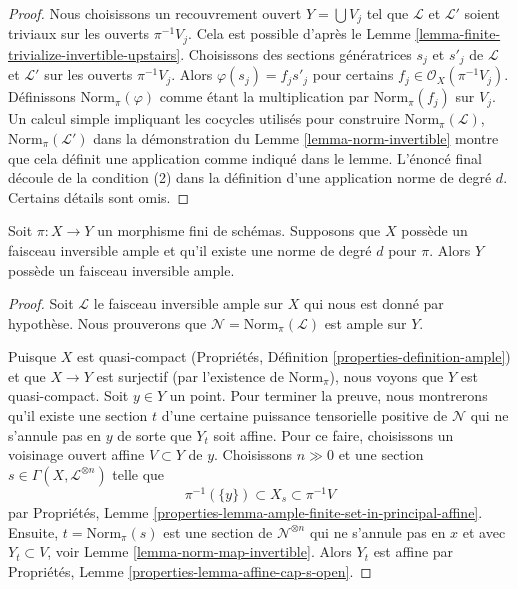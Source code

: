\begin{proof}
Nous choisissons un recouvrement ouvert  $Y = \bigcup V_j$  tel que  $\mathcal{L}$  et
 $\mathcal{L}'$  soient triviaux sur les ouverts  $\pi^{-1}V_j$. Cela est possible
d'après le Lemme  \ref{lemma-finite-trivialize-invertible-upstairs}. Choisissons des sections génératrices  $s_j$ 
et  $s'_j$  de  $\mathcal{L}$  et  $\mathcal{L}'$  sur les ouverts  $\pi^{-1}V_j$.
Alors  $\varphi(s_j) = f_js'_j$  pour certains  $f_j \in \mathcal{O}_X(\pi^{-1}V_j)$. Définissons  $\text{Norm}_\pi(\varphi)$  comme étant
la multiplication par  $\text{Norm}_\pi(f_j)$  sur  $V_j$. Un calcul simple impliquant
les cocycles utilisés pour construire  $\text{Norm}_\pi(\mathcal{L})$,  $\text{Norm}_\pi(\mathcal{L}')$  dans la
démonstration du Lemme  \ref{lemma-norm-invertible}  montre que cela définit une application comme
indiqué dans le lemme. L'énoncé final découle de la condition (2) dans la
définition d'une application norme de degré  $d$. Certains détails sont
omis.
\end{proof}

\begin{lemma}
\label{lemma-norm-ample}
Soit  $\pi : X \to Y$  un morphisme fini de schémas. Supposons que  $X$  possède
un faisceau inversible ample et qu'il existe une norme de degré  $d$  pour
 $\pi$. Alors  $Y$  possède un faisceau inversible ample.
\end{lemma}

\begin{proof}
Soit  $\mathcal{L}$  le faisceau inversible ample sur  $X$  qui nous est donné
par hypothèse. Nous prouverons que  $\mathcal{N} = \text{Norm}_\pi(\mathcal{L})$  est ample sur  $Y$.

\medskip\noindent
Puisque  $X$  est quasi-compact (Propriétés, Définition  \ref{properties-definition-ample}) et
que  $X \to Y$  est surjectif (par l'existence de  $\text{Norm}_\pi$), nous voyons que
 $Y$  est quasi-compact. Soit  $y \in Y$  un point. Pour terminer la
preuve, nous montrerons qu'il existe une section  $t$  d'une certaine
puissance tensorielle positive de  $\mathcal{N}$  qui ne s'annule pas en  $y$ 
de sorte que  $Y_t$  soit affine. Pour ce faire, choisissons un voisinage
ouvert affine  $V \subset Y$  de  $y$. Choisissons  $n \gg 0$  et une section
 $s \in \Gamma(X, \mathcal{L}^{\otimes n})$  telle que
$$
\pi^{-1}(\{y\}) \subset X_s \subset \pi^{-1}V
$$
par Propriétés, Lemme  \ref{properties-lemma-ample-finite-set-in-principal-affine}. Ensuite,  $t = \text{Norm}_\pi(s)$  est une section de
 $\mathcal{N}^{\otimes n}$  qui ne s'annule pas en  $x$  et avec  $Y_t \subset V$, voir Lemme
 \ref{lemma-norm-map-invertible}. Alors  $Y_t$  est affine par Propriétés, Lemme  \ref{properties-lemma-affine-cap-s-open}.
\end{proof}

